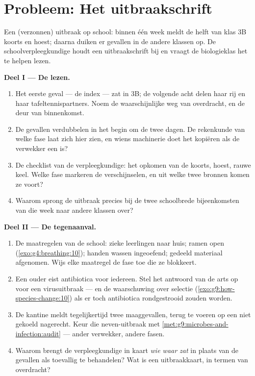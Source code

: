\section{Probleem: Het uitbraakschrift}

\begin{problem}\label{pb:g9:microbes-and-infection:1}
Een (verzonnen) uitbraak op school: binnen één week meldt de helft
van klas 3B koorts en hoest; daarna duiken er gevallen in de andere
klassen op. De schoolverpleegkundige houdt een uitbraakschrift bij
en vraagt de biologieklas het te helpen lezen.

\medskip\noindent\textbf{Deel I --- De  lezen.}
\begin{enumerate}
  \item Het eerste geval --- de index --- zat in 3B; de volgende
        acht delen haar rij en haar tafeltennispartners. Noem de
        waarschijnlijke weg van overdracht, en de deur van
        binnenkomst.
  \item De gevallen verdubbelen in het begin om de twee dagen. De
        rekenkunde van welke fase laat zich hier zien, en wiens
        machinerie doet het kopiëren als de verwekker een 
        is?
  \item De checklist van de verpleegkundige: het opkomen van de
        koorts, hoest, rauwe keel. Welke fase markeren de
        verschijnselen, en uit welke twee bronnen komen ze voort?
  \item Waarom sprong de uitbraak precies bij de twee
        schoolbrede bijeenkomsten van die week naar andere
        klassen over?
\end{enumerate}

\medskip\noindent\textbf{Deel II --- De tegenaanval.}
\begin{enumerate}[resume]
  \item De maatregelen van de school: zieke leerlingen naar huis;
        ramen open
        (\cref{exo:g4:breathing:10}); handen wassen ingeoefend;
        gedeeld materiaal afgenomen. Wijs elke maatregel de fase
        toe die ze blokkeert.
  \item Een ouder eist antibiotica voor iedereen. Stel het
        antwoord van de arts op voor een virusuitbraak --- en de
        waarschuwing over selectie
        (\cref{exo:g9:how-species-change:10}) als er toch
        antibiotica rondgestrooid zouden worden.
  \item De kantine meldt tegelijkertijd twee maaggevallen, terug
        te voeren op een niet gekoeld nagerecht. Keur die
        neven-uitbraak met
        \cref{met:g9:microbes-and-infection:audit} --- ander 
        verwekker, andere fasen.
  \item Waarom brengt de verpleegkundige in kaart \emph{wie waar
        zat} in plaats van de gevallen als toevallig te
        behandelen? Wat is een uitbraakkaart, in termen van
        overdracht?
\end{enumerate}


\end{problem}
